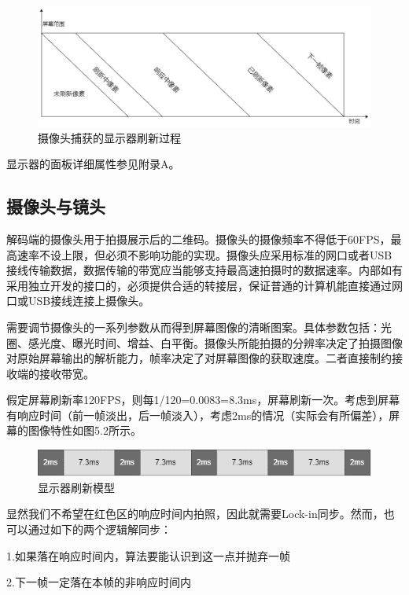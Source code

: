 \begin{figure}[!htbp]
\centering
\includegraphics[scale=0.4]{figures/HW/Cap_Pt.png}
\caption{摄像头捕获的显示器刷新过程}
\end{figure}

显示器的面板详细属性参见附录A。

\subsection{摄像头与镜头}

解码端的摄像头用于拍摄展示后的二维码。摄像头的摄像频率不得低于60FPS，最高速率不设上限，但必须不影响功能的实现。摄像头应采用标准的网口或者USB接线传输数据，数据传输的带宽应当能够支持最高速拍摄时的数据速率。内部如有采用独立开发的接口的，必须提供合适的转接层，保证普通的计算机能直接通过网口或USB接线连接上摄像头。

需要调节摄像头的一系列参数从而得到屏幕图像的清晰图案。具体参数包括：光圈、感光度、曝光时间、增益、白平衡。摄像头所能拍摄的分辨率决定了拍摄图像对原始屏幕输出的解析能力，帧率决定了对屏幕图像的获取速度。二者直接制约接收端的接收带宽。

假定屏幕刷新率120FPS，则每1/120=0.0083=8.3ms，屏幕刷新一次。考虑到屏幕有响应时间（前一帧淡出，后一帧淡入），考虑2ms的情况（实际会有所偏差），屏幕的图像特性如图5.2所示。

\begin{figure}[!htbp]
\centering
\includegraphics[scale=1]{figures/HW/Rf_Model.png}
\caption{显示器刷新模型}
\end{figure}

显然我们不希望在红色区的响应时间内拍照，因此就需要Lock-in同步。然而，也可以通过如下的两个逻辑解同步：

1.如果落在响应时间内，算法要能认识到这一点并抛弃一帧

2.下一帧一定落在本帧的非响应时间内

